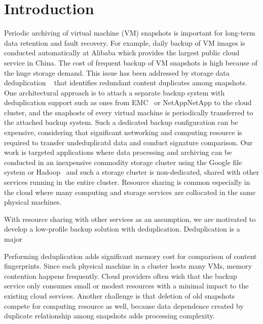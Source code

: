\section{Introduction}
\label{sect:intro}


Periodic  archiving of virtual machine (VM) snapshots is important 
for long-term data  retention and fault recovery. 
For example, daily backup of VM images  is conducted automatically 
at Alibaba which provides the largest public cloud service in China.
The cost of frequent backup of VM snapshots is  high because of the huge storage demand.
This issue has been addressed by   storage data deduplication ~\cite{venti02,bottleneck08} that
identifies redundant content duplicates among snapshots.  
One architectural approach is to attach  a separate backup system with deduplication support such as ones
from  EMC~\cite{EMC} or NetApp{NetApp}
to the cloud cluster, and  the snaphosts of every virtual machine is   periodically transferred to
the attached backup system.  Such a dedicated backup  configuration can be expensive, 
considering that significant networking  and computing resource  is required 
to transfer undeduplicatd data and conduct signature comparison. 
Our work is targeted applications where data processing and archiving  can be conducted
in an inexpensive commodity storage cluster using the  Google file system or Hadoop~\cite{googlefs03}
and such a storage cluster is non-dedicated, shared with other services running in the entire cluster.
Resource sharing is common especially in the cloud where many computing and storage
services are collocated in the same physical machines.


With  resource sharing with other services as an assumption, we are motivated to develop a 
low-profile backup solution with deduplication. 
Deduplication is a major


Performing deduplication adds significant  memory cost for comparison of content fingerprints. 
Since each physical machine in a cluster  hosts many VMs, memory contention happens frequently. 
Cloud providers often wish that the backup service only consumes  small or modest resources 
with a minimal impact to the existing cloud services.  Another challenge is 
that deletion of old snapshots compete for computing resource as well, because data dependence created 
by duplicate relationship among snapshots  adds processing complexity.

